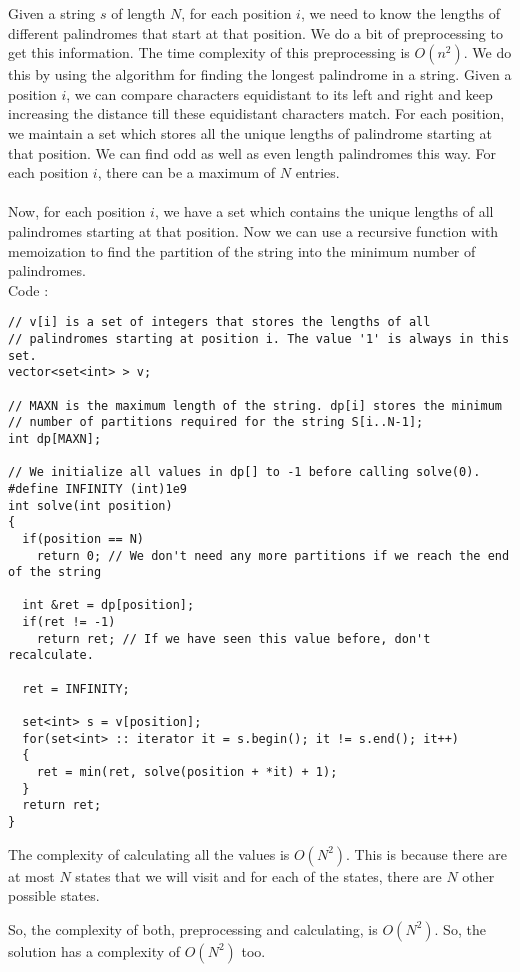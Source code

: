 \documentclass{article}
\begin{document}
Given a string $s$ of length $N$, for each position $i$, we need to know the lengths of different palindromes that start at that position. We do a bit of preprocessing to get this information. The time complexity of this preprocessing is $O(n^2)$. We do this by using the algorithm for finding the longest palindrome in a string. Given a position $i$, we can compare characters equidistant to its left and right and keep increasing the distance till these equidistant characters match. For each position, we maintain a set which stores all the unique lengths of palindrome starting at that position. We can find odd as well as even length palindromes this way. For each position $i$, there can be a maximum of $N$ entries. \\
\\
Now, for each position $i$, we have a set which contains the unique lengths of all palindromes starting at that position. Now we can use a recursive function with memoization to find the partition of the string into the minimum number of palindromes. 
\\
Code : 
\begin{verbatim}
// v[i] is a set of integers that stores the lengths of all 
// palindromes starting at position i. The value '1' is always in this set.
vector<set<int> > v; 

// MAXN is the maximum length of the string. dp[i] stores the minimum 
// number of partitions required for the string S[i..N-1];
int dp[MAXN]; 

// We initialize all values in dp[] to -1 before calling solve(0).
#define INFINITY (int)1e9
int solve(int position)
{
  if(position == N)
    return 0; // We don't need any more partitions if we reach the end of the string
	
  int &ret = dp[position];
  if(ret != -1)
    return ret; // If we have seen this value before, don't recalculate.
	
  ret = INFINITY;

  set<int> s = v[position];
  for(set<int> :: iterator it = s.begin(); it != s.end(); it++)
  {
    ret = min(ret, solve(position + *it) + 1);
  }
  return ret;
}
\end{verbatim}
The complexity of calculating all the values is $O(N^2)$. This is because there are at most $N$ states that we will visit and for each of the states, there are $N$ other possible states. 

So, the complexity of both, preprocessing and calculating, is $O(N^2)$. So, the solution has a complexity of $O(N^2)$ too. 

\clearpage
\end{document}
